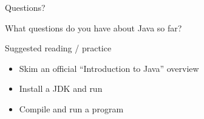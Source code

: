 \documentclass[aspectratio=169,11pt]{beamer}
\begin{document}
    \begin{frame}{Questions?}
        \begin{center}
            {\Large What questions do you have about Java so far?}
        \end{center}
        \vspace{1.2em}
        \begin{block}{Suggested reading / practice}
            \begin{itemize}
                \item Skim an official ``Introduction to Java'' overview
                \item Install a JDK and run 
                \item Compile and run a  program
            \end{itemize}
        \end{block}
    \end{frame}
\end{document}
